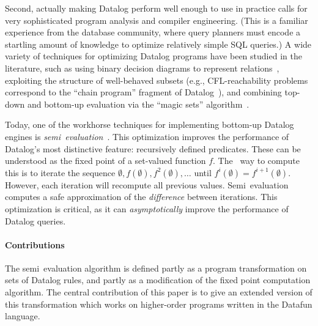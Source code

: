 Second, actually
making Datalog perform well enough to use in practice calls for very
sophisticated program analysis and compiler engineering. (This is a
familiar experience from the database community, where query planners
must encode a startling amount of knowledge to optimize relatively
simple SQL queries.) A wide variety of techniques for optimizing
Datalog programs have been studied in the literature, such as using
binary decision diagrams to represent relations~\cite{whaley-phd},
exploiting the structure of well-behaved subsets (e.g.,
CFL-reachability problems correspond to the ``chain program'' fragment
of Datalog~\cite{chain-programs}), and combining top-down and
bottom-up evaluation via the ``magic sets''
algorithm~\cite{magic-sets}.

Today, one of the workhorse techniques for implementing bottom-up Datalog
engines is \emph{semi\naive\ evaluation}~\cite{seminaive}. This optimization
improves the performance of Datalog's most distinctive feature: recursively
defined predicates. These can be understood as the fixed point of a set-valued
function $f$. The \naive\ way to compute this is to iterate the sequence
$\emptyset, f(\emptyset), f^2(\emptyset), \dots$ until $f^i(\emptyset) =
f^{i+1}(\emptyset)$. However, each iteration will recompute all previous values.
Semi\naive\ evaluation computes a safe approximation of the \emph{difference}
between iterations. This optimization is critical, as it can
\emph{asymptotically} improve the performance of Datalog queries.


\paragraph{Contributions} The semi\naive\ evaluation algorithm is
defined partly as a program transformation on sets of Datalog rules,
and partly as a modification of the fixed point computation algorithm.
The central contribution of this paper is to give an extended version
of this transformation which works on higher-order programs written
in the Datafun language. 

